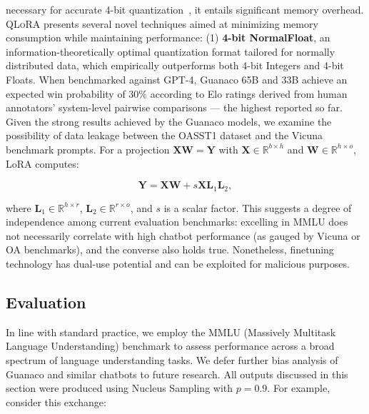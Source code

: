 {{necessary for accurate 4-bit quantization~\citep{dettmers2022case}, it entails significant memory overhead. \textsc{QLoRA} presents several novel techniques aimed at minimizing memory consumption while maintaining performance: (1) \textbf{4-bit NormalFloat}, an information-theoretically optimal quantization format tailored for normally distributed data, which empirically outperforms both 4-bit Integers and 4-bit Floats. When benchmarked against GPT-4, {Guanaco} 65B and 33B achieve an expected win probability of 30\% according to Elo ratings derived from human annotators’ system-level pairwise comparisons — the highest reported so far. Given the strong results achieved by the {Guanaco} models, we examine the possibility of data leakage between the OASST1 dataset and the Vicuna benchmark prompts. For a projection ${\mathbf{X} \mathbf{W} = \mathbf{Y}}$ with $\mathbf{X}\in  \mathbb{R}^{b\times h}$ and $\mathbf{W}\in  \mathbb{R}^{h\times o}$, LoRA computes:

\begin{equation}
    \mathbf{Y} = \mathbf{X}\mathbf{W} + s\mathbf{X}\mathbf{L}_1\mathbf{L}_2,
\end{equation}

where $\mathbf{L}_1\in  \mathbb{R}^{h\times r}$, $\mathbf{L}_2\in  \mathbb{R}^{r\times o}$, and $s$ is a scalar factor. This suggests a degree of independence among current evaluation benchmarks: excelling in MMLU does not necessarily correlate with high chatbot performance (as gauged by Vicuna or OA benchmarks), and the converse also holds true. Nonetheless, finetuning technology has dual-use potential and can be exploited for malicious purposes. \subsection{Evaluation}

In line with standard practice, we employ the MMLU (Massively Multitask Language Understanding) benchmark \citep{hendrycksmeasuring} to assess performance across a broad spectrum of language understanding tasks. We defer further bias analysis of {Guanaco} and similar chatbots to future research. All outputs discussed in this section were produced using Nucleus Sampling \cite{holtzmancurious} with $p=0.9$. For example, consider this exchange:

}}
